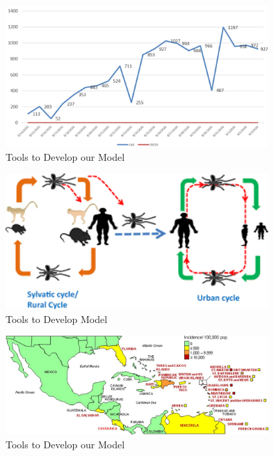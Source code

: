 \begin{figure}[!h]
	\begin{center}
		\includegraphics[width=10cm]{images/statsCaseChad}
	\end{center}
	\caption{Tools to Develop our Model}
	\label{Tools to Develop our Model}
\end{figure}

\begin{figure}[!h]
	\begin{center}
		\includegraphics[width=10cm]{images/trans}
	\end{center}
	\caption{Tools to Develop Model}
	\label{Tools to Develop our Model}
\end{figure}

\begin{figure}[!h]
	\begin{center}
		\includegraphics[width=10cm]{images/zjv9990995820001}
	\end{center}
	\caption{Tools to Develop our Model}
	\label{Tools to Develop our Model}
\end{figure}
